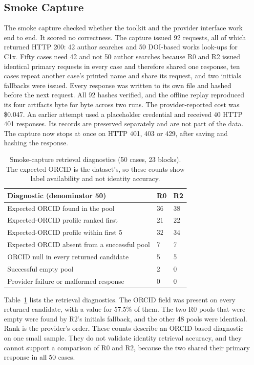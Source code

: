 \subsection{Smoke Capture}
\label{sec:smoke}
The smoke capture checked whether the toolkit and the provider interface work end to end. It scored no correctness. The capture issued 92 requests, all of which returned HTTP 200: 42 author searches and 50 DOI-based works look-ups for C1x. Fifty cases need 42 and not 50 author searches because R0 and R2 issued identical primary requests in every case and therefore shared one response, ten cases repeat another case's printed name and share its request, and two initials fallbacks were issued. Every response was written to its own file and hashed before the next request. All 92 hashes verified, and the offline replay reproduced its four artifacts byte for byte across two runs. The provider-reported cost was \$0.047. An earlier attempt used a placeholder credential and received 40 HTTP 401 responses. Its records are preserved separately and are not part of the data. The capture now stops at once on HTTP 401, 403 or 429, after saving and hashing the response.

\begin{table}[t]
\caption{Smoke-capture retrieval diagnostics (50 cases, 23 blocks). The expected ORCID is the dataset's, so these counts show label availability and not identity accuracy.}
\label{tab:smoke-retrieval}
\centering
\footnotesize
\renewcommand{\arraystretch}{1.1}
\begin{tabular}{@{}p{}p{}p{}@{}}
\toprule
\textbf{Diagnostic (denominator 50)} & \textbf{R0} & \textbf{R2} \\
\midrule
Expected ORCID found in the pool & 36 & 38 \\
Expected-ORCID profile ranked first & 21 & 22 \\
Expected-ORCID profile within first 5 & 32 & 34 \\
Expected ORCID absent from a successful pool & 7 & 7 \\
ORCID null in every returned candidate & 5 & 5 \\
Successful empty pool & 2 & 0 \\
Provider failure or malformed response & 0 & 0 \\
\bottomrule
\end{tabular}
\end{table}

Table~\ref{tab:smoke-retrieval} lists the retrieval diagnostics. The ORCID field was present on every returned candidate, with a value for 57.5\% of them. The two R0 pools that were empty were found by R2's initials fallback, and the other 48 pools were identical. Rank is the provider's order. These counts describe an ORCID-based diagnostic on one small sample. They do not validate identity retrieval accuracy, and they cannot support a comparison of R0 and R2, because the two shared their primary response in all 50 cases.


